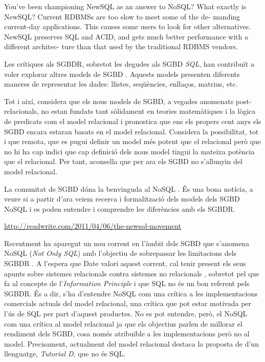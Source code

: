 You’ve been championing NewSQL as an answer to NoSQL?
What exactly is NewSQL?
Current RDBMSs are too slow to meet some of the de-
manding current-day applications. This causes some users to
look for other alternatives. NewSQL preserves SQL and ACID,
and gets much better performance with a different architec-
ture than that used by the traditional RDBMS vendors.



\todo{}

\textcite{datedarwen13:notosql_notonosql}



Les crítiques als SGBDR, sobretot les degudes als SGBD
\emph{SQL}, han contribuït a voler explorar altres models de
SGBD \parencite{stonebraker09}. Aquests models presenten diferents
maneres de representar les dades: llistes, seqüències, enllaços,
matrius, etc.

Tot i així, \textcite[cap.~21--25]{date06} considera que els nous
models de SGBD, a vegades anomenats post-relacionals, no estan fundats
tant sòlidament en teories matemàtiques i la lògica de predicats com
el model relacional i pronostica que ens els propers cent anys els
SGBD encara estaran basats en el model
relacional. %
Considera la possibilitat, tot i que remota, que es pugui definir un
model més potent que el relacional però que no hi ha cap indici que
cap definició dels nous model tingui la mateixa potència que el
relacional. Per tant, aconsella que per ara els SGBD no s'allunyin del
model relacional. %



\todo{} La comunitat de SGBD dóna la benvinguda al NoSQL
\cite{atzeni13:relational_model_dead}. És una bona notícia, a veure si
a partir d'ara veiem recerca i formalització dels models dels SGBD
NoSQL i es poden entendre i comprendre les diferències amb els SGBDR.

\url{http://readwrite.com/2011/04/06/the-newsql-movement}


Recentment ha aparegut un nou corrent en l'àmbit dels SGBD que
s'anomena NoSQL (\emph{Not Only SQL}) amb l'objectiu de sobrepassar
les limitacions dels SGBDR \parencite{edlich:nosql,stonebraker10}.  A
l'espera que Date valori aquest corrent, cal tenir present els seus
apunts sobre sistemes relacionals contra sistemes no
relacionals \parencite[part 7]{date06}, sobretot pel que fa al
concepte de l'\emph{Information Principle} i que SQL no és un bon
referent pels SGBDR. És a dir, s'ha d'entendre NoSQL com una crítica a
les implementacions comercials actuals del model relacional, una
crítica que pot estar motivada per l'ús de SQL per part d'aquest
productes.  No es pot entendre, però, el NoSQL com una crítica al
model relacional ja que els objectius parlen de millorar el rendiment
dels SGBD, cosa només atribuïble a les implementacions però no al
model. Precisament, actualment del model relacional destaca la
proposta de \citeauthor{date:tutoriald} d'un llenguatge,
\emph{Tutorial D}, que no és SQL.


